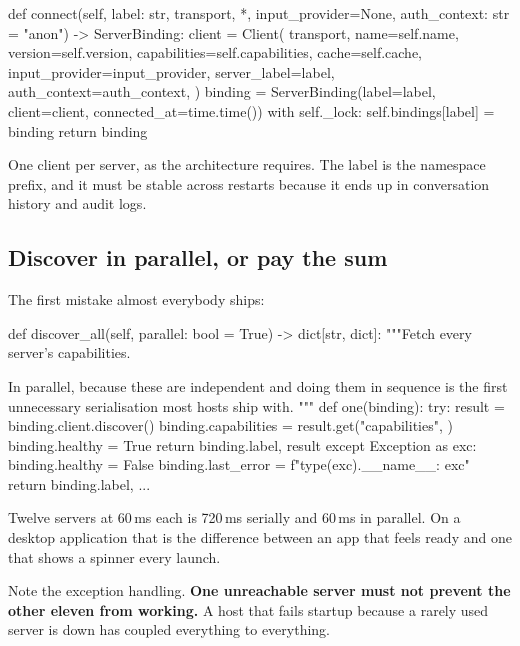 \begin{py}
def connect(self, label: str, transport, *, input_provider=None,
            auth_context: str = "anon") -> ServerBinding:
    client = Client(
        transport,
        name=self.name, version=self.version,
        capabilities=self.capabilities,
        cache=self.cache,
        input_provider=input_provider,
        server_label=label,
        auth_context=auth_context,
    )
    binding = ServerBinding(label=label, client=client,
                            connected_at=time.time())
    with self._lock:
        self.bindings[label] = binding
    return binding
\end{py}

One client per server, as the architecture requires. The label is the namespace
prefix, and it must be stable across restarts because it ends up in
conversation history and audit logs.

\subsection{Discover in parallel, or pay the sum}

The first mistake almost everybody ships:

\begin{py}
def discover_all(self, parallel: bool = True) -> dict[str, dict]:
    """Fetch every server's capabilities.

    In parallel, because these are independent and doing them in sequence
    is the first unnecessary serialisation most hosts ship with.
    """
    def one(binding):
        try:
            result = binding.client.discover()
            binding.capabilities = result.get("capabilities", {})
            binding.healthy = True
            return binding.label, result
        except Exception as exc:
            binding.healthy = False
            binding.last_error = f"{type(exc).__name__}: {exc}"
            return binding.label, {}
    ...
\end{py}

Twelve servers at 60\,ms each is 720\,ms serially and 60\,ms in parallel. On a
desktop application that is the difference between an app that feels ready and
one that shows a spinner every launch.

Note the exception handling. \textbf{One unreachable server must not prevent the
other eleven from working.} A host that fails startup because a rarely used
server is down has coupled everything to everything.


